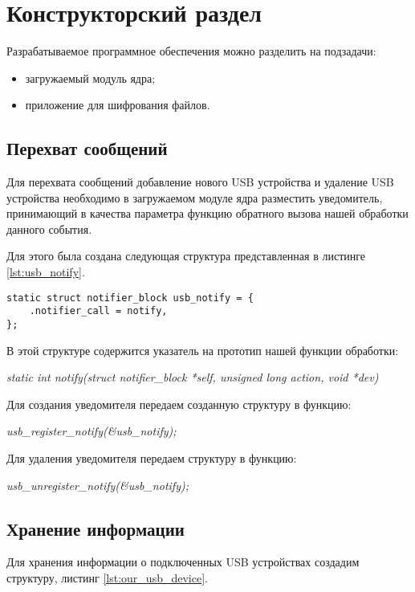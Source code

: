 \chapter{\textbf{Конструкторский раздел}}

\hfill

Разрабатываемое программное обеспечения можно разделить на подзадачи:
\begin{itemize}
\item загружаемый модуль ядра;
\item приложение для шифрования файлов.
\end{itemize}

\section{\textbf{Перехват сообщений}}

\hfill

Для перехвата сообщений добавление нового USB устройства и удаление USB устройства необходимо в загружаемом модуле ядра разместить уведомитель, принимающий в качества параметра функцию обратного вызова нашей обработки данного события.

Для этого была создана следующая структура представленная в листинге \ref{lst:usb_notify}.

 \begin{lstlisting}[caption = Структура usb\_notify, label =  lst:usb_notify]
static struct notifier_block usb_notify = {
    .notifier_call = notify,
};
 \end{lstlisting}
 
 В этой структуре содержится указатель на прототип нашей функции обработки:

\textit{static int notify(struct notifier\_block *self, unsigned long action, void *dev)}

Для создания уведомителя передаем созданную структуру в функцию:

\textit{usb\_register\_notify(\&usb\_notify);}

Для удаления уведомителя передаем структуру в функцию:

\textit{usb\_unregister\_notify(\&usb\_notify);}

\section{\textbf{Хранение информации}}

\hfill

Для хранения информации о подключенных USB устройствах создадим структуру, листинг \ref{lst:our_usb_device}.


